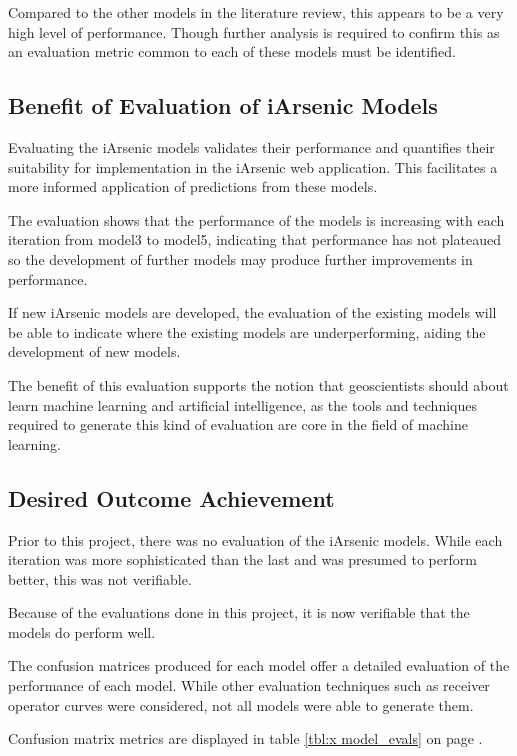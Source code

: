 Compared to the other models in the literature review, this appears to be a very high level of performance. Though further analysis is required to confirm this as an evaluation metric common to each of these models must be identified. 

\subsection{Benefit of Evaluation of iArsenic Models}

Evaluating the iArsenic models validates their performance and quantifies their suitability for implementation in the iArsenic web application. This facilitates a more informed application of predictions from these models.

The evaluation shows that the performance of the models is increasing with each iteration from model3 to model5, indicating that performance has not plateaued so the development of further models may produce further improvements in performance.

If new iArsenic models are developed, the evaluation of the existing models will be able to indicate where the existing models are underperforming, aiding the development of new models.

The benefit of this evaluation supports the notion that geoscientists should about learn machine learning and artificial intelligence, as the tools and techniques required to generate this kind of evaluation are core in the field of machine learning. 

\subsection{Desired Outcome Achievement}

Prior to this project, there was no evaluation of the iArsenic models. While each iteration was more sophisticated than the last and was presumed to perform better, this was not verifiable.

Because of the evaluations done in this project, it is now verifiable that the models do perform well.

The confusion matrices produced for each model offer a detailed evaluation of the performance of each model. While other evaluation techniques such as receiver operator curves were considered, not all models were able to generate them.

Confusion matrix metrics are displayed in table \ref{tbl:x model_evals} on page \pageref{tbl:x model_evals}.

